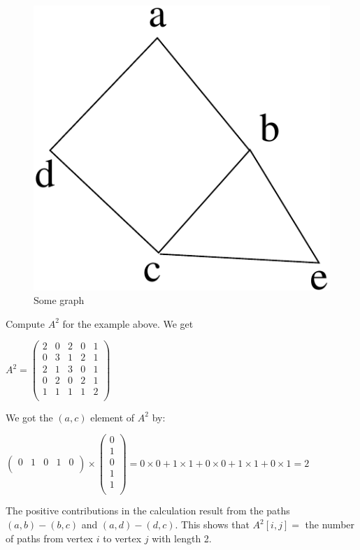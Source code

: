 \begin{figure}[ht]
	\centering
	\includegraphics[width=0.15\linewidth,keepaspectratio]{adjacency1}
	\caption{ Some graph \label{adjacency1}}
\end{figure}

\begin{example}
Compute $A^{2}$ for the example above. We get

\begin{center}
$
A^{2} = \left(
\begin{array}{ccccc}
2 & 0 & 2 & 0 & 1\\
0 & 3 & 1 & 2 & 1\\
2 & 1 & 3 & 0 & 1\\
0 & 2 & 0 & 2 & 1\\
1 & 1 & 1 & 1 & 2\\
\end{array}
\right)
$
\end{center}

We got the $(a,c)$ element of $A^{2}$ by:

\begin{center}
$
\left(
\begin{array}{ccccc}
0 & 1 & 0 & 1 & 0\\
\end{array}
\right)
\times
\left(
\begin{array}{c}
0\\
1\\
0\\
1\\
1\\
\end{array}
\right)
 =
0\times 0 + 1\times 1 + 0\times 0 + 1\times 1 + 0\times 1 = 2$
\end{center}

The positive contributions in the calculation result from the paths
$(a,b)-(b,c)$ and $(a,d)-(d,c)$. This shows that $A^{2}[i,j] = $ the
number of paths from vertex $i$ to vertex $j$ with length 2.
\end{example}


